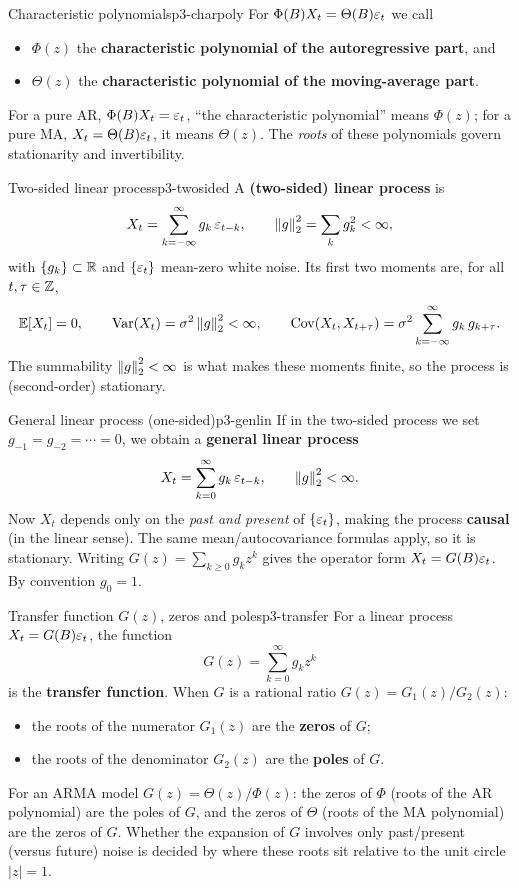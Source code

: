 \begin{definition}{Characteristic polynomials}{p3-charpoly}
For $\Phi(B)X_t=\Theta(B)\varepsilon_t$ we call
\begin{itemize}
  \item $\Phi(z)$ the \textbf{characteristic polynomial of the autoregressive
        part}, and
  \item $\Theta(z)$ the \textbf{characteristic polynomial of the moving-average
        part}.
\end{itemize}
For a pure $\mathrm{AR}$, $\Phi(B)X_t=\varepsilon_t$, ``the characteristic
polynomial'' means $\Phi(z)$; for a pure $\mathrm{MA}$,
$X_t=\Theta(B)\varepsilon_t$, it means $\Theta(z)$. The \emph{roots} of these
polynomials govern stationarity and invertibility.
\end{definition}

\begin{definition}{Two-sided linear process}{p3-twosided}
A \textbf{(two-sided) linear process} is
\[
X_t=\sum_{k=-\infty}^{\infty}g_k\,\varepsilon_{t-k},
\qquad \left\lVert g \right\rVert_2^2=\sum_k g_k^2<\infty,
\]
with $\{g_k\}\subset\mathbb{R}$ and $\{\varepsilon_t\}$ mean-zero white noise. Its first
two moments are, for all $t,\tau\in\mathbb{Z}$,
\[
\mathbb{E}[X_t]=0,\qquad
\operatorname{Var}(X_t)=\sigma^2\left\lVert g \right\rVert_2^2<\infty,\qquad
\operatorname{Cov}(X_t,X_{t+\tau})=\sigma^2\sum_{k=-\infty}^{\infty}g_k\,g_{k+\tau}.
\]
The summability $\left\lVert g \right\rVert_2^2<\infty$ is what makes these moments finite, so the
process is (second-order) stationary.
\end{definition}

\begin{definition}{General linear process (one-sided)}{p3-genlin}
If in the two-sided process we set $g_{-1}=g_{-2}=\cdots=0$, we obtain a
\textbf{general linear process}
\[
X_t=\sum_{k=0}^{\infty}g_k\,\varepsilon_{t-k},\qquad \left\lVert g \right\rVert_2^2<\infty .
\]
Now $X_t$ depends only on the \emph{past and present} of $\{\varepsilon_t\}$, making
the process \textbf{causal} (in the linear sense). The same mean/autocovariance
formulas apply, so it is stationary. Writing $G(z)=\sum_{k\ge0}g_kz^k$ gives the
operator form $X_t=G(B)\varepsilon_t$. By convention $g_0=1$.
\end{definition}

\begin{definition}{Transfer function $G(z)$, zeros and poles}{p3-transfer}
For a linear process $X_t=G(B)\varepsilon_t$, the function
\[
G(z)=\sum_{k=0}^{\infty}g_k z^{k}
\]
is the \textbf{transfer function}. When $G$ is a rational ratio
$G(z)=G_1(z)/G_2(z)$:
\begin{itemize}
  \item the roots of the numerator $G_1(z)$ are the \textbf{zeros} of $G$;
  \item the roots of the denominator $G_2(z)$ are the \textbf{poles} of $G$.
\end{itemize}
For an $\mathrm{ARMA}$ model $G(z)=\Theta(z)/\Phi(z)$: the zeros of $\Phi$
(roots of the AR polynomial) are the poles of $G$, and the zeros of $\Theta$
(roots of the MA polynomial) are the zeros of $G$. Whether the expansion of
$G$ involves only past/present (versus future) noise is decided by where these
roots sit relative to the unit circle $|z|=1$.
\end{definition}

